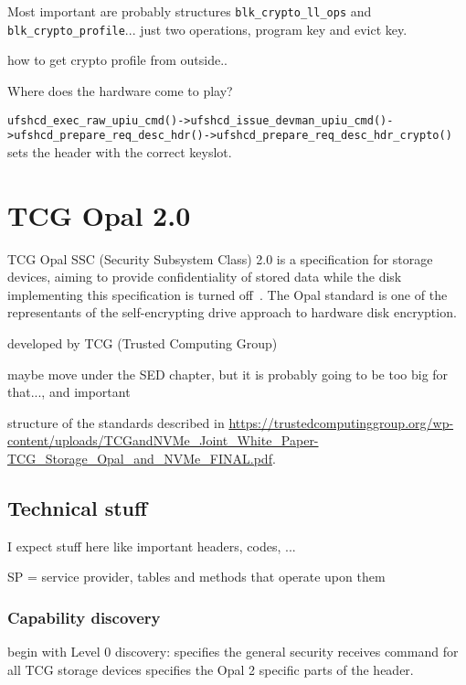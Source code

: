 \documentclass[
  digital, %
  oneside, %
  nolof,     %
  nolot,     %
]{fithesis4}
\begin{document}
Most important are probably structures \verb|blk_crypto_ll_ops| and \verb|blk_crypto_profile|... just two operations, program key and evict key. 



how to get crypto profile from outside..




Where does the hardware come to play?

\verb|ufshcd_exec_raw_upiu_cmd()->ufshcd_issue_devman_upiu_cmd()->ufshcd_prepare_req_desc_hdr()->ufshcd_prepare_req_desc_hdr_crypto()| sets the header with the correct keyslot.

\chapter{TCG Opal 2.0}

TCG Opal SSC (Security Subsystem Class) 2.0 is a specification for storage devices, aiming to provide confidentiality of stored data while the disk implementing this specification is turned off~\cite{tcg-opal2}. The Opal standard is one of the representants of the self-encrypting drive approach to hardware disk encryption.

developed by TCG (Trusted Computing Group)

maybe move under the SED chapter, but it is probably going to be too big for that..., and important


structure of the standards described in \url{https://trustedcomputinggroup.org/wp-content/uploads/TCGandNVMe_Joint_White_Paper-TCG_Storage_Opal_and_NVMe_FINAL.pdf}.



\section{Technical stuff}

I expect stuff here like important headers, codes, ...

SP = service provider, tables and methods that operate upon them

\subsection{Capability discovery}

begin with Level 0 discovery: \parencite[3.3.6]{tcg-storage-core} specifies the general security receives command for all TCG storage devices \cite[3.1.1]{tcg-opal2} specifies the Opal 2 specific parts of the header.
\end{document}
